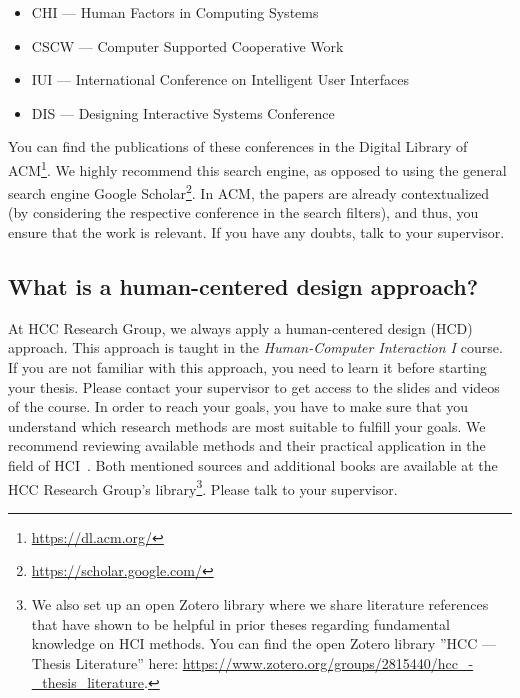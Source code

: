 \begin{itemize}
    \itemsep0em %
    \item CHI --- Human Factors in Computing Systems
    \item CSCW --- Computer Supported Cooperative Work
    \item IUI --- International Conference on Intelligent User Interfaces
    \item DIS --- Designing Interactive Systems Conference
\end{itemize}

You can find the publications of these conferences in the Digital Library of ACM\footnote{ \url{https://dl.acm.org/}}. We highly recommend this search engine, as opposed to using the general search engine Google Scholar\footnote{\url{https://scholar.google.com/}}. In ACM, the papers are already contextualized (by considering the respective conference in the search filters), and thus, you ensure that the work is relevant. If you have any doubts, talk to your supervisor.

\subsection*{What is a human-centered design approach?}
At HCC Research Group, we always apply a human-centered design (HCD) approach. This approach is taught in the \emph{Human-Computer Interaction I} course. If you are not familiar with this approach, you need to learn it before starting your thesis. Please contact your supervisor to get access to the slides and videos of the course. In order to reach your goals, you have to make sure that you understand which research methods are most suitable to fulfill your goals. We recommend reviewing available methods and their practical application in the field of HCI~\cite{lazar2017research, olson2014ways}. Both mentioned sources and additional books are available at the HCC Research Group's library\footnote{We also set up an open Zotero library where we share literature references that have shown to be helpful in prior theses regarding fundamental knowledge on HCI methods. You can find the open Zotero library ''HCC --- Thesis Literature'' here: \url{https://www.zotero.org/groups/2815440/hcc_-_thesis_literature}.}. Please talk to your supervisor.


\afterpage{\nopagecolor}